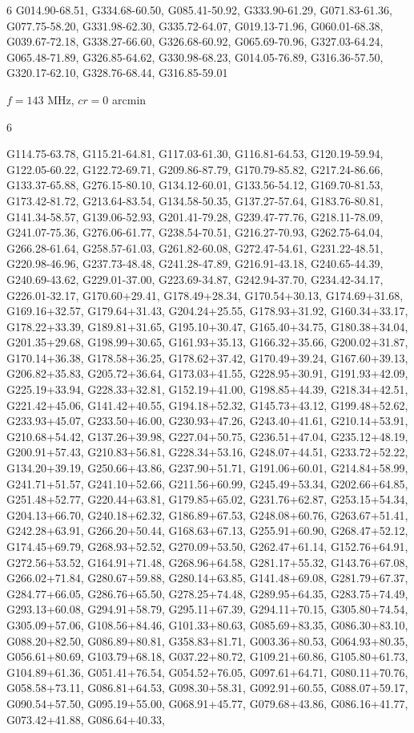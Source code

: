 \documentclass[12pt,a4paper]{article}
\newcommand{\numofcol}{6}
\begin{document}
\begin{multicols}{\numofcol}
G014.90-68.51, G334.68-60.50, G085.41-50.92, G333.90-61.29, G071.83-61.36, G077.75-58.20, G331.98-62.30, G335.72-64.07, G019.13-71.96, G060.01-68.38, G039.67-72.18, G338.27-66.60, G326.68-60.92, G065.69-70.96, G327.03-64.24, G065.48-71.89, G326.85-64.62, G330.98-68.23, G014.05-76.89, G316.36-57.50, G320.17-62.10, G328.76-68.44, G316.85-59.01
\end{multicols}

$f = 143$ MHz, $cr = 0$ arcmin
\begin{multicols}{\numofcol}
\raggedright
\footnotesize 
G114.75-63.78, G115.21-64.81, G117.03-61.30, G116.81-64.53, G120.19-59.94, G122.05-60.22, G122.72-69.71, G209.86-87.79, G170.79-85.82, G217.24-86.66, G133.37-65.88, G276.15-80.10, G134.12-60.01, G133.56-54.12, G169.70-81.53, G173.42-81.72, G213.64-83.54, G134.58-50.35, G137.27-57.64, G183.76-80.81, G141.34-58.57, G139.06-52.93, G201.41-79.28, G239.47-77.76, G218.11-78.09, G241.07-75.36, G276.06-61.77, G238.54-70.51, G216.27-70.93, G262.75-64.04, G266.28-61.64, G258.57-61.03, G261.82-60.08, G272.47-54.61, G231.22-48.51, G220.98-46.96, G237.73-48.48, G241.28-47.89, G216.91-43.18, G240.65-44.39, G240.69-43.62, G229.01-37.00, G223.69-34.87, G242.94-37.70, G234.42-34.17, G226.01-32.17, G170.60+29.41, G178.49+28.34, G170.54+30.13, G174.69+31.68, G169.16+32.57, G179.64+31.43, G204.24+25.55, G178.93+31.92, G160.34+33.17, G178.22+33.39, G189.81+31.65, G195.10+30.47, G165.40+34.75, G180.38+34.04, G201.35+29.68, G198.99+30.65, G161.93+35.13, G166.32+35.66, G200.02+31.87, G170.14+36.38, G178.58+36.25, G178.62+37.42, G170.49+39.24, G167.60+39.13, G206.82+35.83, G205.72+36.64, G173.03+41.55, G228.95+30.91, G191.93+42.09, G225.19+33.94, G228.33+32.81, G152.19+41.00, G198.85+44.39, G218.34+42.51, G221.42+45.06, G141.42+40.55, G194.18+52.32, G145.73+43.12, G199.48+52.62, G233.93+45.07, G233.50+46.00, G230.93+47.26, G243.40+41.61, G210.14+53.91, G210.68+54.42, G137.26+39.98, G227.04+50.75, G236.51+47.04, G235.12+48.19, G200.91+57.43, G210.83+56.81, G228.34+53.16, G248.07+44.51, G233.72+52.22, G134.20+39.19, G250.66+43.86, G237.90+51.71, G191.06+60.01, G214.84+58.99, G241.71+51.57, G241.10+52.66, G211.56+60.99, G245.49+53.34, G202.66+64.85, G251.48+52.77, G220.44+63.81, G179.85+65.02, G231.76+62.87, G253.15+54.34, G204.13+66.70, G240.18+62.32, G186.89+67.53, G248.08+60.76, G263.67+51.41, G242.28+63.91, G266.20+50.44, G168.63+67.13, G255.91+60.90, G268.47+52.12, G174.45+69.79, G268.93+52.52, G270.09+53.50, G262.47+61.14, G152.76+64.91, G272.56+53.52, G164.91+71.48, G268.96+64.58, G281.17+55.32, G143.76+67.08, G266.02+71.84, G280.67+59.88, G280.14+63.85, G141.48+69.08, G281.79+67.37, G284.77+66.05, G286.76+65.50, G278.25+74.48, G289.95+64.35, G283.75+74.49, G293.13+60.08, G294.91+58.79, G295.11+67.39, G294.11+70.15, G305.80+74.54, G305.09+57.06, G108.56+84.46, G101.33+80.63, G085.69+83.35, G086.30+83.10, G088.20+82.50, G086.89+80.81, G358.83+81.71, G003.36+80.53, G064.93+80.35, G056.61+80.69, G103.79+68.18, G037.22+80.72, G109.21+60.86, G105.80+61.73, G104.89+61.36, G051.41+76.54, G054.52+76.05, G097.61+64.71, G080.11+70.76, G058.58+73.11, G086.81+64.53, G098.30+58.31, G092.91+60.55, G088.07+59.17, G090.54+57.50, G095.19+55.00, G068.91+45.77, G079.68+43.86, G086.16+41.77, G073.42+41.88, G086.64+40.33, 
\end{multicols}
\end{document}
